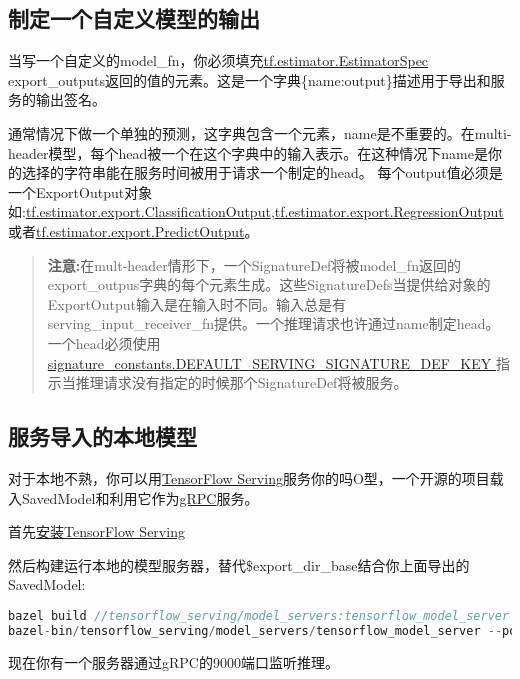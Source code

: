 \subsection{制定一个自定义模型的输出}
当写一个自定义的model\_fn，你必须填充\href{https://www.tensorflow.org/api_docs/python/tf/estimator/EstimatorSpec?hl=zh-cn}{tf.estimator.EstimatorSpec }export\_outputs返回的值的元素。这是一个字典\{name:output\}描述用于导出和服务的输出签名。

通常情况下做一个单独的预测，这字典包含一个元素，name是不重要的。在multi-header模型，每个head被一个在这个字典中的输入表示。在这种情况下name是你的选择的字符串能在服务时间被用于请求一个制定的head。
每个output值必须是一个ExportOutput对象如:\href{https://www.tensorflow.org/api_docs/python/tf/estimator/export/ClassificationOutput?hl=zh-cn}{tf.estimator.export.ClassificationOutput},\href{https://www.tensorflow.org/api_docs/python/tf/estimator/export/RegressionOutput?hl=zh-cn}{tf.estimator.export.RegressionOutput}或者\href{https://www.tensorflow.org/api_docs/python/tf/estimator/export/PredictOutput?hl=zh-cn}{tf.estimator.export.PredictOutput}。
\begin{quote}
\textbf{注意:}在mult-header情形下，一个SignatureDef将被model\_fn返回的export\_outpus字典的每个元素生成。这些SignatureDefs当提供给对象的ExportOutput输入是在输入时不同。输入总是有serving\_input\_receiver\_fn提供。一个推理请求也许通过name制定head。一个head必须使用\href{https://www.github.com/tensorflow/tensorflow/blob/r1.4/tensorflow/python/saved_model/signature_constants.py}{signature\_constants.DEFAULT\_SERVING\_SIGNATURE\_DEF\_KEY }指示当推理请求没有指定的时候那个SignatureDef将被服务。
\end{quote}
\subsection{服务导入的本地模型}
对于本地不熟，你可以用\href{http://github.com/tensorflow/serving}{TensorFlow Serving}服务你的吗O型，一个开源的项目载入SavedModel和利用它作为\href{http://www.grpc.io/}{gRPC}服务。

首先\href{http://github.com/tensorflow/serving}{安装TensorFlow Serving}

然后构建运行本地的模型服务器，替代\$export\_dir\_base结合你上面导出的SavedModel:
\begin{lstlisting}[language=C++]
bazel build //tensorflow_serving/model_servers:tensorflow_model_server
bazel-bin/tensorflow_serving/model_servers/tensorflow_model_server --port=9000 --model_base_path=$export_dir_base 
\end{lstlisting}
现在你有一个服务器通过gRPC的9000端口监听推理。
